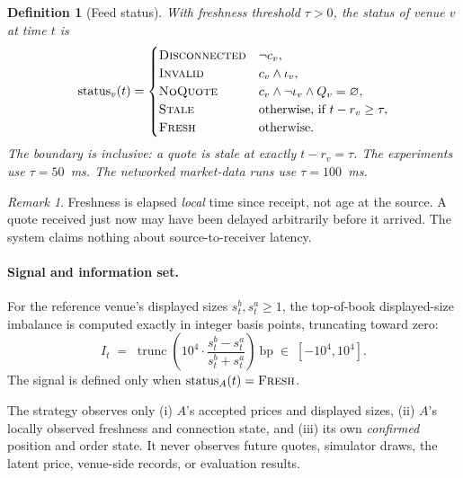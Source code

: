 \documentclass[11pt]{article}
\newtheorem{definition}{Definition}
\theoremstyle{remark}
\newtheorem*{remark}{Remark}
\begin{document}
\begin{definition}[Feed status]
With freshness threshold $\tau > 0$, the status of venue $v$ at time $t$ is
\[
  \mathrm{status}_v(t) =
  \begin{cases}
    \textsc{Disconnected} & \neg c_v,\\
    \textsc{Invalid}      & c_v \wedge \iota_v,\\
    \textsc{NoQuote}      & c_v \wedge \neg\iota_v \wedge Q_v = \varnothing,\\
    \textsc{Stale}        & \text{otherwise, if } t - r_v \ge \tau,\\
    \textsc{Fresh}        & \text{otherwise}.
  \end{cases}
\]
The boundary is inclusive: a quote is stale at exactly $t - r_v = \tau$. The experiments use
$\tau = 50$~ms. The networked market-data runs use $\tau = 100$~ms.
\end{definition}

\begin{remark}
Freshness is elapsed \emph{local} time since receipt, not age at the source. A quote received
just now may have been delayed arbitrarily before it arrived. The system claims nothing about
source-to-receiver latency.
\end{remark}

\paragraph{Signal and information set.}

For the reference venue's displayed sizes $s^b_t, s^a_t \ge 1$, the top-of-book displayed-size
imbalance is computed exactly in integer basis points, truncating toward zero:
\begin{equation}
  I_t \;=\; \operatorname{trunc}\!\left( 10^4 \cdot \frac{s^b_t - s^a_t}{s^b_t + s^a_t} \right)
  \ \text{bp} \;\in\; [-10^4, 10^4].
\end{equation}
The signal is defined only when $\mathrm{status}_A(t) = \textsc{Fresh}$.

The strategy observes only (i) $A$'s accepted prices and displayed sizes, (ii) $A$'s locally
observed freshness and connection state, and (iii) its own \emph{confirmed} position and order
state. It never observes future quotes, simulator draws, the latent price, venue-side records,
or evaluation results.

\end{document}
